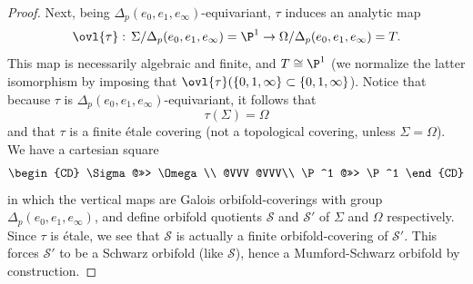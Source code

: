 \begin{proof}
 Next, being $\Delta_p(e_0,e_1,e_\infty)$-equivariant, $\tau$ induces an
 analytic map
 \begin{equation*}
  \ovl{\tau}: \, \Sigma/\Delta_p(e_0,e_1,e_\infty)=\P^1
   \to \Omega/\Delta_p(e_0,e_1,e_\infty)=T.
 \end{equation*}
 This map is necessarily algebraic and finite, and $T\cong \P^1$ (we
 normalize the latter isomorphism by imposing that
 $\ovl{\tau}(\{0,1,\infty\}\subset \{0,1,\infty\}$). Notice that because
 $\tau$ is $\Delta_p(e_0,e_1,e_\infty)$-equivariant, 
 it follows that
 \begin{equation*}
  \tau(\Sigma)= \Omega 
 \end{equation*} 
 and that $\tau$ is a finite \'etale covering (not a topological
 covering, unless $\Sigma=\Omega$). We have a cartesian 
 square 
 \begin{equation*}
 \begin{CD}
  \Sigma @>>> \Omega \\
  @VVV @VVV\\
  \P^1 @>>> \P^1
 \end{CD}
 \end{equation*}
 in which the vertical maps are Galois
 orbifold-coverings with group $\Delta_p(e_0,e_1,e_\infty)$, and define
 orbifold quotients $\mathcal{S}$ and $\mathcal{S}'$ of $\Sigma$ and
 $\Omega$ respectively. Since $\tau$ is \'etale, we see that
 $\mathcal{S}$ is actually a finite orbifold-covering of
 $\mathcal{S}'$. This forces $\mathcal{S}'$ to be a Schwarz orbifold
 (like $\mathcal{S}$), hence a Mumford-Schwarz orbifold by construction.
\end{proof}

